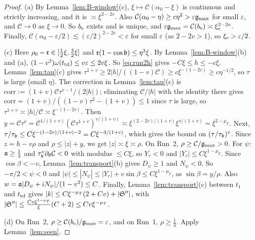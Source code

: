 \begin{proof}
(a) By Lemma~\ref{lem:B-window}(c), $\xi\mapsto \mathcal C(\alpha_0-\xi)$ is continuous and strictly increasing, and it is
$\asymp\xi^{2-2v}$. Also $\mathcal C(\alpha_0-\eta)\ge c\eta^2>\varepsilon\mathfrak{g}_{\max}$ for small $\varepsilon$, and $\mathcal C\to0$ as $\xi\to0$. So $b_{\mathrm{e}}$
exists and is unique, and $\varepsilon\mathfrak{g}_{\max}=\mathcal C(b_{\mathrm{e}})\asymp\xi_{\mathrm{e}}^{2-2v}$. Finally,
$\mathcal C(\alpha_0-\varepsilon/2)\lesssim(\varepsilon/2)^{2-2v}<\varepsilon$ for small $\varepsilon$ (as $2-2v>1$), so $\xi_{\mathrm{e}}>\varepsilon/2$.

(c) Here $\rho_0-\mathfrak{r}\in[\frac12\xi,\frac32\xi]$ and $\mathfrak{r}(1-\cos\mathfrak{b})\le\eta^3\xi$. By Lemma~\ref{lem:B-window}(b) and (a),
$(1-v^2)\omega(t_{\mathrm{td}})\le v\varepsilon\le2v\xi$. So \eqref{eq:run2h} gives $-C\xi\le h\le-c\xi$. Lemma~\ref{lem:tau}(c) gives
$\tau^{1+v}\ge2|h|/((1-v)\mathcal C)\ge c\xi^{-(1-2v)}\ge c\eta^{-1/2}$, so $\tau$ is large (small $\eta$). The correction in
Lemma~\ref{lem:tau}(c) is $\mathrm{corr}:=(1+v)\mathcal C\tau^{v-1}/(2|h|)$; eliminating $\mathcal C/|h|$ with the identity
there gives $\mathrm{corr}=(1+v)/((1-v)\tau^2-(1+v))\le1$ since $\tau$ is large, so $\tau^{1+v}\asymp|h|/\mathcal C\asymp\xi^{-(1-2v)}$. Then
$y=\mathcal C\tau^v=\mathcal C^{1/(1+v)}(\mathcal C\tau^{1+v})^{v/(1+v)}\asymp\xi^{(2-2v)/(1+v)}\xi^{v/(1+v)}=\xi^{2-\mu_T}$. Next,
$\tau/\tau_{\mathfrak{b}}\le C\xi^{-(1-2v)/(1+v)-2}=C\xi^{-3/(1+v)}$, which gives the bound on $(\tau/\tau_{\mathfrak{b}})^v$. Since $z=h-v\rho$ and
$\rho\le|z|+y$, we get $|z|\asymp\xi\asymp\rho$. On Run~2, $\rho\ge \mathcal C/\mathfrak{g}_{\max}>0$.
For $\psi$: $\mathfrak{a}\ge\frac13$ and $\tau_{\mathfrak{b}}^v\partial_\theta\mathcal C<0$ with modulus $\le C\xi$, so $Y_r<0$ and $|Y_r|\le C\xi^{1-\mu_T}$.
Since $\cos\beta<-v$, Lemma~\ref{lem:transport}(b) gives $D_\psi\ge1$ and $N_\psi<0$. So $-\pi/2<\psi<0$ and
$|\psi|\le|N_\psi|\le|Y_r|+v\sin\beta\le C\xi^{1-\mu_T}$, as $\sin\beta=y/\rho$. Also $w=\mathfrak{a}|D_\psi+iN_\psi|/(1-v^2)\le C$. Finally,
Lemma~\ref{lem:transport}(c) between $t_1$ and $t_{\mathrm{td}}$ gives
$|k|\le C\xi^{-\mu_T}(2+Cv)+|\mathfrak{S}''|$, with $|\mathfrak{S}''|\le\frac{Cv\xi^{1-\mu_T}}{\xi}(C+2)\le Cv\xi^{-\mu_T}$.

(d) On Run~2, $\rho\ge \mathcal C(b_{\mathrm{e}})/\mathfrak{g}_{\max}=\varepsilon$, and on Run~1, $\rho\ge\frac13$. Apply Lemma~\ref{lem:seen}.


\end{proof}
